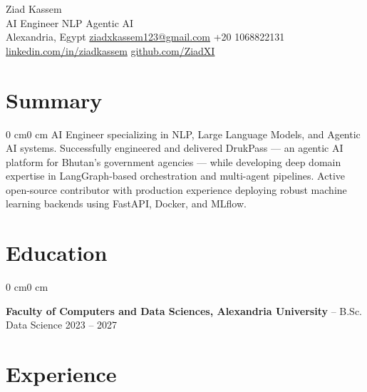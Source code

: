 \documentclass[10pt, letterpaper]{article}
\newenvironment{onecolentry}{\begin{adjustwidth}{0 cm}{0 cm}}{\end{adjustwidth}}
\newenvironment{twocolentry}[2][]{%
    \onecolentry
    \def\secondColumn{#2}%
}{%
    \unskip\hfill\secondColumn
    \endonecolentry
}
\begin{document}
\begin{center}
    {\LARGE Ziad Kassem} \\
    \vspace{4pt}
    AI Engineer \textbar{} NLP \textbar{} Agentic AI \\[2pt]
    Alexandria, Egypt \quad
    \href{mailto:ziadxkassem123@gmail.com}{ziadxkassem123@gmail.com} \quad
    +20 1068822131 \quad
    \href{https://www.linkedin.com/in/ziad-kassem-85684021b/}{linkedin.com/in/ziadkassem} \quad
    \href{https://github.com/ZiadXI}{github.com/ZiadXI}
\end{center}

\section{Summary}
\begin{onecolentry}
AI Engineer specializing in NLP, Large Language Models, and Agentic AI systems. Successfully engineered and delivered DrukPass --- an agentic AI platform for Bhutan's government agencies --- while developing deep domain expertise in LangGraph-based orchestration and multi-agent pipelines. Active open-source contributor with production experience deploying robust machine learning backends using FastAPI, Docker, and MLflow.
\end{onecolentry}

\section{Education}
\begin{twocolentry}{2023 -- 2027}
    \textbf{Faculty of Computers and Data Sciences, Alexandria University} -- B.Sc. Data Science
\end{twocolentry}

\section{Experience}
\end{document}
